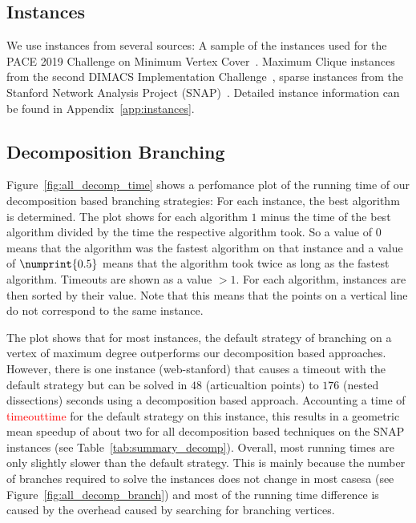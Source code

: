 \documentclass[a4paper,UKenglish,cleveref, autoref, thm-restate]{lipics-v2021}
\begin{document}
\subsection{Instances}
We use instances from several sources: A sample of the instances used for the
PACE 2019 Challenge on Minimum Vertex Cover~\cite{dzulfikar_et_al:LIPIcs:2019:11486}. Maximum Clique instances from the second
DIMACS Implementation Challenge~\cite{johnson1993cliques}, sparse instances from
the Stanford Network Analysis Project (SNAP)~\cite{snapnets}. Detailed instance information can
be found in Appendix~\ref{app:instances}.

\subsection{Decomposition Branching}
\label{sec:experiments_decomp}

Figure~\ref{fig:all_decomp_time} shows a perfomance plot of the running time of
our decomposition based branching strategies: For each instance, the best
algorithm is determined. The plot shows for each algorithm $1$ minus the time of the best algorithm
divided by the time the respective algorithm took. So a value of $0$ means that
the algorithm was the fastest algorithm on that instance and a value of
$\numprint{0.5}$ means that the algorithm took twice as long as the fastest
algorithm. Timeouts are shown as a value $> 1$. For each algorithm, instances
are then sorted by their value. Note that this means that the points on a
vertical line do not correspond to the same instance.

The plot shows that for most instances, the default strategy of branching on a
vertex of maximum degree outperforms our decomposition based approaches.
However, there is one instance (web-stanford) that causes a timeout with the
default strategy but can be solved in $48$ (articualtion points) to $176$ (nested
dissections) seconds using a decomposition based approach. Accounting a time of
\textcolor{red}{timeouttime} for the default strategy on
this instance, this results in a geometric mean speedup of about two for all
decomposition based techniques on the SNAP instances (see Table~\ref{tab:summary_decomp}). Overall, most running
times are only slightly slower than the default strategy. This is mainly because
the number of branches required to solve the instances does not change in most
casesa (see Figure~\ref{fig:all_decomp_branch}) and most of the running time difference is caused by the overhead caused by
searching for branching vertices.
\end{document}
